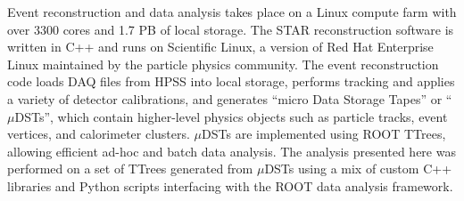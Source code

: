 Event reconstruction and data analysis takes place on a Linux compute farm
with over 3300 cores and 1.7 PB of local storage. The STAR reconstruction
software is written in C++ and runs on Scientific Linux, a version of Red Hat
Enterprise Linux maintained by the particle physics community. The event
reconstruction code loads DAQ files from HPSS into local storage, performs
tracking and applies a variety of detector calibrations, and generates ``micro
Data Storage Tapes'' or ``$\mu$DSTs'', which contain higher-level physics
objects such as particle tracks, event vertices, and calorimeter clusters.
$\mu$DSTs are implemented using ROOT \cite{Brun:1997pa} TTrees, allowing
efficient ad-hoc and batch data analysis. The analysis presented here was
performed on a set of TTrees generated from $\mu$DSTs using a mix of custom
C++ libraries and Python scripts interfacing with the ROOT data analysis
framework.
